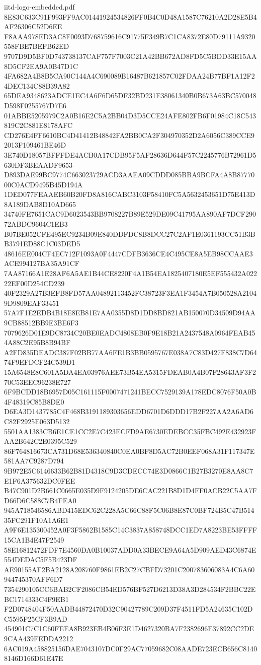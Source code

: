 \begin{filecontents*}[overwrite]{iitd-logo-embedded.pdf}
8E83C633C91F993FF9AC01441924534826FF0B4C0D48A1587C76210A2D28E5B4AF26306C52D6EE
F8AAA978ED3AC8F0093D768759616C91775F349B7C1CA8372E80D79111A9320558FBE7BEFB62ED
9707D9D5BF0D743738137CAF757F7003C21A42BB672AD8FD5C5BDD33E15AA8D5CF2EA9A0B47D1C
4FA682A4B8B5CA90C144A4C690089B16487B621857C02FDAA24B77BF1A12F24DEC134C88B39A82
65DEA9348623ADCE1EC4A6F6D65DF32BD231E38061340B0B673A63BC570048D598F0255767D7E6
01ABBE5205979C2A0B16E2C5A2BB04D3D5CCE24AFE802FB6F01984C18C543819C2C881E8178AFC
CD276E4FF6610BC4D41412B48842FA2BB0CA2F304970352D2A6056C389CCE92013F109461BE46D
3E740D18057BFFFDE4ACB0A17CDB95F5AF28636D644F57C2245776B72961D5630DF3BEAADF9653
D893DAE99BC9774C663023729ACD3AAEA09CDDD085BBA9BCFA4A8B8777000C0ACD9495B45D194A
1DED077FEAAEB60B20FD8A816CABC3103F58410FC5A5632453651D75E413D8A189DAB8D10AD665
34740FE7651CAC9D6023543BB9708227B89E529DE09C41795AA890AF7DCF29072ABDC9604C1EB3
B07BE052CFE495EC9234B09E840DDFDC8B8DCC27C2AF1E0361193CC51B3BB3791ED88C1C03DED5
48616EE004CF4EC712F1093A0F4447CDFB3636CE4C495CE8A5EB98CCAAE3ACE994127BA35A91CF
7AA87166A1E28AF6A5AE1B44CE8220F4A1B54EA1825407180E5EF555432A02222EF00D254CD239
40F2329A27B3EFB8FD57AA04892113452FC38723F3EA1F3454A7B050528A21049D9809EAF33451
57A7F1E2EDB4B18E8EB81E7AA0355D8D1DD8BD821AB150070D34509D94AA9CB88512BB9E3BE6F3
7079626D01E9DC8734C20BE0EADC4808EB0F9E18B21A2437548A0964FEAB454A88C2E95B8B94BF
A2FD835DEADC387F02BB77AA6FE1B3BB0595767E038A7C83D427F838C7D6474F9EFDCF24C539D1
15A6548E8C601A5DA4EA03976AEE73B54EA5315FDEAB0A4B07F28643AF3F270C53EEC96238E727
6F9BCDD18B6957D05C161115F0007471241BECC7529139A178EDC8076F50A0B4F48319C85B8DE0
D6EA3D1437785C4F468B3191189303656EDD6701D6DDD17B2F227AA2A6AD6C82F2925E063D5132
5501AA1383CB6E1CE1CC2E7C423ECFD9AE6730EDEBCC35FBC492E432923FAA2B642C2E0395C529
86F764816673CA731D68E536340840C0EA0BF8D5AC72B0EEF068A31F117347E581AA7C9287D794
9B972E5C6146633B62B81D4318C9D3CDECC74E3D0866C1B27B3270E8AA8C7E1F6A375632DC0FEE
B47C901D2B661C0665E035D9F9124205DE6CAC221B8D1D4FF0ACB22C5AA7FD66D6C588C7B4FEA0
945A718546586ABD415EDC62C228A5C66C88F5C06B8E87C0BF724B5C47B51435FC291F10A1A6E1
A9F6E135300452A0F3F5862B1585C14C3837A858748DCC1ED7A8223BE53FFFF15CA1B4E47F2549
58E16812472FDF7E4560DA0B10037ADD0A33BECE9A64A5D909AED43C6874E554DEDAC5F5B423DF
AE90155AF2BA2128A208760F9861EB2C27CBFD73201C200783606083A4C6A60944745370AFF6D7
7354290105CC6BAB2CF2086CB54ED576BF527D6213D38A3D284534F2BBC22EBC1714333C4F9EB1
F2D0748404F50AADB44872470D32C90427789C209D37F4511FD5A24635C102DC5595F25CF3B9AD
454901C7C1C60FEEA8B923EB4B06F3E1D4627320BA7F2382696E37892CC2DE9CAA439FEDDA2212
6AC019A458825156DAE7043107DC0F29AC77059682C08AADE723ECB656C81408146D166D61E47E

\end{filecontents*}
